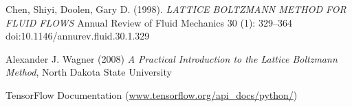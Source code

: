 \documentclass{article}
\begin{document}
\begin{thebibliography}{99}

 Chen, Shiyi, Doolen, Gary D. (1998). \emph{LATTICE BOLTZMANN METHOD FOR FLUID FLOWS} Annual Review of Fluid Mechanics 30 (1): 329–364 doi:10.1146/annurev.fluid.30.1.329

 Alexander J. Wagner (2008) \emph{A Practical Introduction to the Lattice Boltzmann Method}, North Dakota State University

 TensorFlow Documentation (\url{www.tensorflow.org/api_docs/python/})

\end{thebibliography}
\end{document}
